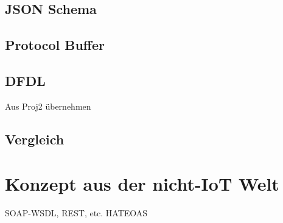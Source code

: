 \subsection{JSON Schema}

\subsection{Protocol Buffer}

\subsection{DFDL}
Aus Proj2 übernehmen

\subsection{Vergleich}






\section{Konzept aus der nicht-IoT Welt}
SOAP-WSDL, REST, etc.
HATEOAS
